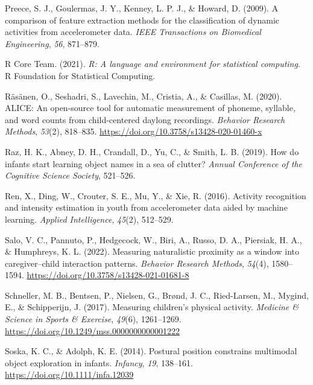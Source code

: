 \documentclass[
  man]{apa6}
\newlength{\cslhangindent}
\newlength{\cslentryspacingunit} %
\newenvironment{CSLReferences}[2] %
 {%
  \setlength{\parindent}{0pt}
  \ifodd #1
  \let\oldpar\par
  \def\par{\hangindent=\cslhangindent\oldpar}
  \fi
  \setlength{\parskip}{#2\cslentryspacingunit}
 }%
 {}
\begin{document}
\begin{CSLReferences}{1}{0}
\leavevmode{}%
Preece, S. J., Goulermas, J. Y., Kenney, L. P. J., \& Howard, D. (2009). A comparison of feature extraction methods for the classification of dynamic activities from accelerometer data. \emph{IEEE Transactions on Biomedical Engineering}, \emph{56}, 871--879.

\leavevmode{}%
R Core Team. (2021). \emph{R: A language and environment for statistical computing}. {R Foundation for Statistical Computing}.

\leavevmode{}%
Räsänen, O., Seshadri, S., Lavechin, M., Cristia, A., \& Casillas, M. (2020). {ALICE}: An open-source tool for automatic measurement of phoneme, syllable, and word counts from child-centered daylong recordings. \emph{Behavior Research Methods}, \emph{53}(2), 818--835. \url{https://doi.org/10.3758/s13428-020-01460-x}

\leavevmode{}%
Raz, H. K., Abney, D. H., Crandall, D., Yu, C., \& Smith, L. B. (2019). How do infants start learning object names in a sea of clutter? \emph{Annual Conference of the Cognitive Science Society}, 521--526.

\leavevmode{}%
Ren, X., Ding, W., Crouter, S. E., Mu, Y., \& Xie, R. (2016). Activity recognition and intensity estimation in youth from accelerometer data aided by machine learning. \emph{Applied Intelligence}, \emph{45}(2), 512--529.

\leavevmode{}%
Salo, V. C., Pannuto, P., Hedgecock, W., Biri, A., Russo, D. A., Piersiak, H. A., \& Humphreys, K. L. (2022). Measuring naturalistic proximity as a window into caregiver--child interaction patterns. \emph{Behavior Research Methods}, \emph{54}(4), 1580--1594. \url{https://doi.org/10.3758/s13428-021-01681-8}

\leavevmode{}%
Schneller, M. B., Bentsen, P., Nielsen, G., Brønd, J. C., Ried-Larsen, M., Mygind, E., \& Schipperijn, J. (2017). Measuring children's physical activity. \emph{Medicine \& Science in Sports \& Exercise}, \emph{49}(6), 1261--1269. \url{https://doi.org/10.1249/mss.0000000000001222}

\leavevmode{}%
Soska, K. C., \& Adolph, K. E. (2014). Postural position constrains multimodal object exploration in infants. \emph{Infancy}, \emph{19}, 138--161. \url{https://doi.org/10.1111/infa.12039}


\end{CSLReferences}
\end{document}
